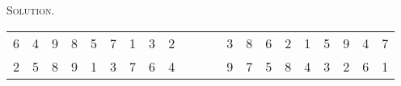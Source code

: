 \documentclass[12pt, a4paper, oneside]{article}
\newenvironment{solution}{\par\noindent\textsc{Solution. }}{\\\par}
\begin{document}
\begin{solution}
\begin{table}[]
\begin{tabular}{llllll|l|l|l|lll|l|l|l|llllll}
				\multicolumn{1}{|l|}{6} & \multicolumn{1}{l|}{4} & \multicolumn{1}{l|}{9} & \multicolumn{1}{l|}{8} & \multicolumn{1}{l|}{5} & 7 & 1 & 3 & 2 &                        &                        &   & 3 & 8 & 6 & \multicolumn{1}{l|}{2} & \multicolumn{1}{l|}{1} & \multicolumn{1}{l|}{5} & \multicolumn{1}{l|}{9} & \multicolumn{1}{l|}{4} & \multicolumn{1}{l|}{7} \\ \cline{1-9} \cline{13-21} 
				\multicolumn{1}{|l|}{2} & \multicolumn{1}{l|}{5} & \multicolumn{1}{l|}{8} & \multicolumn{1}{l|}{9} & \multicolumn{1}{l|}{1} & 3 & 7 & 6 & 4 &                        &                        &   & 9 & 7 & 5 & \multicolumn{1}{l|}{8} & \multicolumn{1}{l|}{4} & \multicolumn{1}{l|}{3} & \multicolumn{1}{l|}{2} & \multicolumn{1}{l|}{6} & \multicolumn{1}{l|}{1} \\ \cline{1-9} \cline{13-21} 
			\end{tabular}
		\end{table}
	\end{solution}
\end{document}
